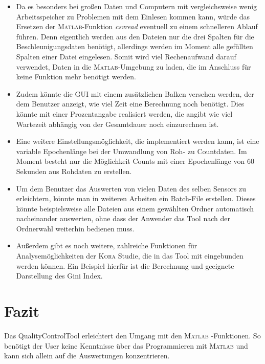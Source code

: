 \documentclass[onecolumn,german]{article}
\begin{document}
\begin{itemize}
\item Da es besonders bei großen Daten und Computern mit vergleichsweise wenig Arbeitsspeicher zu Problemen mit dem Einlesen kommen kann, würde das Ersetzen der \textsc{Matlab}-Funktion \textit{csvread} eventuell zu einem schnelleren Ablauf führen. Denn eigentlich werden aus den Dateien nur die drei Spalten für die Beschleunigungsdaten benötigt, allerdings werden im Moment alle gefüllten Spalten einer Datei eingelesen. Somit wird viel Rechenaufwand darauf verwendet, Daten in die \textsc{Matlab}-Umgebung zu laden, die im Anschluss für keine Funktion mehr benötigt werden.

\item Zudem könnte die GUI mit einem zusätzlichen Balken versehen werden, der dem Benutzer anzeigt, wie viel Zeit eine Berechnung noch benötigt. Dies könnte mit einer Prozentangabe realisiert werden, die angibt wie viel Wartezeit abhängig von der Gesamtdauer noch einzurechnen ist.

\item Eine weitere Einstellungsmöglichkeit, die implementiert werden kann, ist eine variable Epochenlänge bei der Umwandlung von Roh- zu Countdaten. Im Moment besteht nur die Möglichkeit Counts mit einer Epochenlänge von 60 Sekunden aus Rohdaten zu erstellen.

\item Um dem Benutzer das Auswerten von vielen Daten des selben Sensors zu erleichtern, könnte man in weiteren Arbeiten ein Batch-File erstellen. Dieses könnte beispielsweise alle Dateien aus einem gewählten Ordner automatisch nacheinander auswerten, ohne dass der Anwender das Tool nach der Ordnerwahl weiterhin bedienen muss.

\item Außerdem gibt es noch weitere, zahlreiche Funktionen für Analysemöglichkeiten der \textsc{Kora} Studie, die in das Tool mit eingebunden werden können. Ein Beispiel hierfür ist die Berechnung und geeignete Darstellung des Gini Index.
\end{itemize}

\newpage
\section{Fazit}

Das QualityControlTool erleichtert den Umgang mit den \textsc{Matlab} -Funktionen. So benötigt der User keine Kenntnisse über das Programmieren mit \textsc{Matlab} und kann sich allein auf die Auswertungen konzentrieren.\newline
\end{document}
